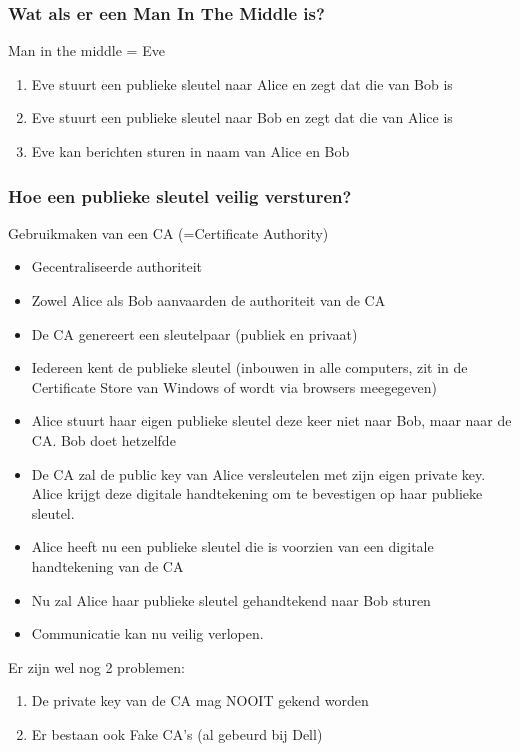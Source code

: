 \documentclass{article}
\begin{document}
\subsubsection{Wat als er een Man In The Middle is?}

Man in the middle = Eve

\begin{enumerate}
    \item Eve stuurt een publieke sleutel naar Alice en zegt dat die van Bob is
    \item Eve stuurt een publieke sleutel naar Bob en zegt dat die van Alice is
    \item Eve kan berichten sturen in naam van Alice en Bob
\end{enumerate}

\subsubsection{Hoe een publieke sleutel veilig versturen?}

Gebruikmaken van een CA (=Certificate Authority)

\begin{itemize}
    \item Gecentraliseerde authoriteit
    \item Zowel Alice als Bob aanvaarden de authoriteit van de CA
    \item De CA genereert een sleutelpaar (publiek en privaat)
    \item Iedereen kent de publieke sleutel (inbouwen in alle computers, zit in de Certificate Store van Windows of wordt via browsers meegegeven)
    \item Alice stuurt haar eigen publieke sleutel deze keer niet naar Bob, maar naar de CA. Bob doet hetzelfde
    \item De CA zal de public key van Alice versleutelen met zijn eigen private key. Alice krijgt deze digitale handtekening om te bevestigen op haar publieke sleutel.
    \item Alice heeft nu een publieke sleutel die is voorzien van een digitale handtekening van de CA
    \item Nu zal Alice haar publieke sleutel gehandtekend naar Bob sturen
    \item Communicatie kan nu veilig verlopen.
\end{itemize}

Er zijn wel nog 2 problemen:

\begin{enumerate}
    \item De private key van de CA mag NOOIT gekend worden
    \item Er bestaan ook Fake CA's (al gebeurd bij Dell)
\end{enumerate}
\end{document}
